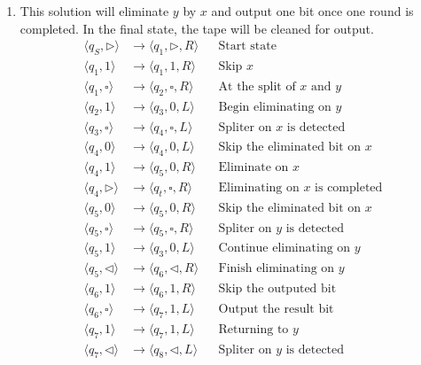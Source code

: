 \documentclass[12pt,a4paper]{article}
\makeatletter
\newtheorem*{solution}{Solution}
\theoremstyle{definition}
\renewenvironment{solution}[1][Solution] {\par\pushQED{\qed}\normalfont\topsep6\p@\@plus6\p@\relax\trivlist\item[\hskip\labelsep\bfseries#1\@addpunct{.}]\ignorespaces}{\popQED\endtrivlist\@endpefalse} \makeatother
\makeatother
\begin{document}
\begin{enumerate}
\begin{enumerate}
	\begin{solution}
		This solution will eliminate $y$ by $x$ and output one bit once one round is completed. In the final state, the tape will be cleaned for output.
		\begin{align*}
			\langle q_S, \triangleright \rangle &\rightarrow \langle q_1, \triangleright,  R\rangle && \text{Start state}\\
			\langle q_1, 1 \rangle &\rightarrow \langle q_1, 1 , R\rangle && \text{Skip }x\\
			\langle q_1, \square \rangle &\rightarrow \langle q_2, \square, R \rangle&&\text{At the split of }x\text{ and }y\\
			\langle q_2, 1\rangle &\rightarrow \langle q_3, 0, L \rangle &&\text{Begin eliminating on }y\\
			\langle q_3, \square\rangle &\rightarrow \langle q_4, \square, L\rangle &&\text{Spliter on }x\text{ is detected}\\
			\langle q_4, 0 \rangle &\rightarrow \langle q_4, 0, L\rangle&&\text{Skip the eliminated bit on }x\\
			\langle q_4, 1 \rangle &\rightarrow \langle q_5, 0, R\rangle&&\text{Eliminate on }x\\
			\langle q_4, \triangleright \rangle &\rightarrow \langle q_t, \square, R\rangle&&\text{Eliminating on }x\text{ is completed}\\
			\langle q_5, 0 \rangle &\rightarrow \langle q_5, 0, R\rangle&&\text{Skip the eliminated bit on } x\\
			\langle q_5,\square \rangle &\rightarrow \langle q_5, \square ,R \rangle&&\text{Spliter on }y\text{ is detected}\\
			\langle q_5, 1\rangle &\rightarrow \langle q_3, 0, L\rangle&&\text{Continue eliminating on }y\\
			\langle q_5, \triangleleft \rangle &\rightarrow \langle q_6, \triangleleft, R \rangle&&\text{Finish eliminating on } y\\
			\langle q_6, 1 \rangle &\rightarrow \langle q_6, 1, R\rangle&&\text{Skip the outputed bit}\\
			\langle q_6, \square\rangle &\rightarrow \langle q_7, 1, L \rangle && \text{Output the result bit}\\
			\langle q_7, 1 \rangle &\rightarrow \langle q_7, 1, L\rangle&&\text{Returning to }y\\
			\langle q_7, \triangleleft \rangle &\rightarrow \langle q_8,\triangleleft, L\rangle&&\text{Spliter on }y\text{ is detected}\\

\end{align*}
\end{solution}
\end{enumerate}
\end{enumerate}
\end{document}
